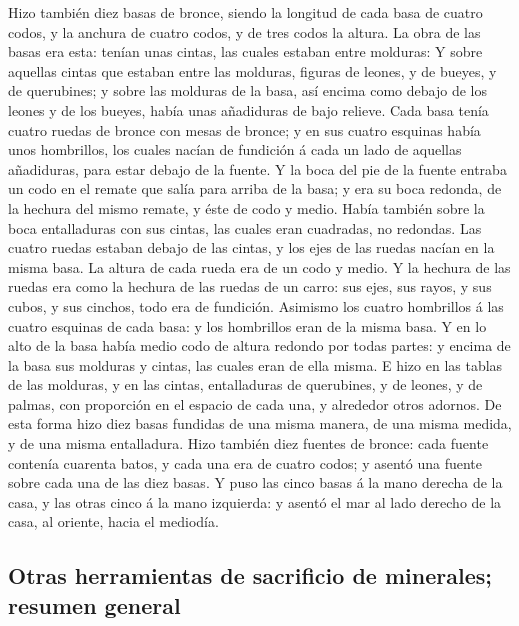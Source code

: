  Hizo también diez basas de bronce, siendo la longitud de
cada basa de cuatro codos, y la anchura de cuatro codos, y de tres codos
la altura.  La obra de las basas era esta: tenían unas
cintas, las cuales estaban entre molduras:  Y sobre
aquellas cintas que estaban entre las molduras, figuras de leones, y de
bueyes, y de querubines; y sobre las molduras de la basa, así encima
como debajo de los leones y de los bueyes, había unas añadiduras de bajo
relieve.  Cada basa tenía cuatro ruedas de bronce con
mesas de bronce; y en sus cuatro esquinas había unos hombrillos, los
cuales nacían de fundición á cada un lado de aquellas añadiduras, para
estar debajo de la fuente.  Y la boca del pie de la
fuente entraba un codo en el remate que salía para arriba de la basa; y
era su boca redonda, de la hechura del mismo remate, y éste de codo y
medio. Había también sobre la boca entalladuras con sus cintas, las
cuales eran cuadradas, no redondas.  Las cuatro ruedas
estaban debajo de las cintas, y los ejes de las ruedas nacían en la
misma basa. La altura de cada rueda era de un codo y medio.
 Y la hechura de las ruedas era como la hechura de las
ruedas de un carro: sus ejes, sus rayos, y sus cubos, y sus cinchos,
todo era de fundición.  Asimismo los cuatro hombrillos á
las cuatro esquinas de cada basa: y los hombrillos eran de la misma
basa.  Y en lo alto de la basa había medio codo de altura
redondo por todas partes: y encima de la basa sus molduras y cintas, las
cuales eran de ella misma.  E hizo en las tablas de las
molduras, y en las cintas, entalladuras de querubines, y de leones, y de
palmas, con proporción en el espacio de cada una, y alrededor otros
adornos.  De esta forma hizo diez basas fundidas de una
misma manera, de una misma medida, y de una misma entalladura.
 Hizo también diez fuentes de bronce: cada fuente
contenía cuarenta batos, y cada una era de cuatro codos; y asentó una
fuente sobre cada una de las diez basas.  Y puso las
cinco basas á la mano derecha de la casa, y las otras cinco á la mano
izquierda: y asentó el mar al lado derecho de la casa, al oriente, hacia
el mediodía.

\hypertarget{otras-herramientas-de-sacrificio-de-minerales-resumen-general}{%
\subsection{Otras herramientas de sacrificio de minerales; resumen
general}\label{otras-herramientas-de-sacrificio-de-minerales-resumen-general}}

